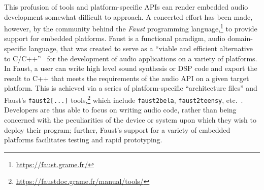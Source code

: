 This profusion of tools and platform-specific APIs can render embedded audio
development somewhat difficult to approach.
A concerted effort has been made, however, by the community behind the
\textit{Faust} programming language,\footnote{\url{https://faust.grame.fr/}} to
provide support for embedded platforms.
Faust is a functional paradigm, audio domain-specific language, that was created
to serve as a ``viable and efficient alternative to
C/C++''~\citep{orlarey_faust_2009} for the development of audio applications on
a variety of platforms.
In Faust, a user can write high level sound synthesis or DSP code and export the
result to C++ that meets the requirements of the audio API on a given target
platform.
This is achieved via a series of platform-specific ``architecture files'' and
Faust's \texttt{faust2[...]} tools,\footnote{
    \url{https://faustdoc.grame.fr/manual/tools/}
} which include
\texttt{faust2bela}, \texttt{faust2teensy}, etc.~\citep{michon_real_2019,
    michon_embedded_2020}.
Developers are thus able to focus on writing audio code, rather than being
concerned with the peculiarities of the device or system upon which they wish
to deploy their program;
further, Faust's support for a variety of embedded platforms facilitates testing
and rapid prototyping.

